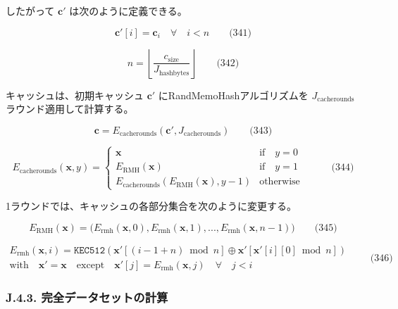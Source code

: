 \documentclass[
]{ltjsarticle}
\begin{document}
したがって \(\mathbf{c'}\) は次のように定義できる。

\protect\hypertarget{eq-341}{}{}

\[\mathbf{c'}[i] = \mathbf{c}_{i} \quad \forall \quad i < n \qquad \text{(341)}\]

\protect\hypertarget{eq-342}{}{}

\[n = \left\lfloor\frac{c_{\mathrm{size}}}{J_{\mathrm{hashbytes}}}\right\rfloor \qquad \text{(342)}\]

キャッシュは、初期キャッシュ \(\mathbf{c'}\)
にRandMemoHashアルゴリズムを \(J_{\mathrm{cacherounds}}\)
ラウンド適用して計算する。

\protect\hypertarget{eq-343}{}{}

\[\mathbf{c} = E_{\mathrm{cacherounds}}(\mathbf{c'}, J_{\mathrm{cacherounds}}) \qquad \text{(343)}\]

\protect\hypertarget{eq-344}{}{}

\[E_{\mathrm{cacherounds}}(\mathbf{x}, y) = \begin{cases}
\mathbf{x} & \text{if} \quad y = 0 \quad  \\
E_\text{RMH}(\mathbf{x}) & \text{if} \quad y = 1 \quad  \\
E_{\mathrm{cacherounds}}(E_\text{RMH}(\mathbf{x}), y -1 ) & \text{otherwise}
\end{cases} \qquad \text{(344)}\]

1ラウンドでは、キャッシュの各部分集合を次のように変更する。

\protect\hypertarget{eq-345}{}{}

\[E_\text{RMH}(\mathbf{x}) = \big( E_{\mathrm{rmh}}(\mathbf{x}, 0), E_{\mathrm{rmh}}(\mathbf{x}, 1), ... , E_{\mathrm{rmh}}(\mathbf{x}, n - 1) \big){} \qquad \text{(345)}\]

\protect\hypertarget{eq-346}{}{}

\[\begin{gathered}
  E_{\mathrm{rmh}}(\mathbf{x}, i) = \texttt{KEC512}(\mathbf{x'}[(i - 1 + n) \bmod n] \oplus \mathbf{x'}[\mathbf{x'}[i][0] \bmod n]) \\
  \text{with} \quad \mathbf{x'} = \mathbf{x} \quad \text{except} \quad \mathbf{x'}[j] = E_{\mathrm{rmh}}(\mathbf{x}, j) \quad \forall \quad j < i
\end{gathered} \qquad \text{(346)}\]

\protect\hypertarget{dataset}{}{}

\hypertarget{j.4.3.-ux5b8cux5168ux30c7ux30fcux30bfux30bbux30c3ux30c8ux306eux8a08ux7b97}{%
\subsubsection{J.4.3.
完全データセットの計算}\label{j.4.3.-ux5b8cux5168ux30c7ux30fcux30bfux30bbux30c3ux30c8ux306eux8a08ux7b97}}
\end{document}
